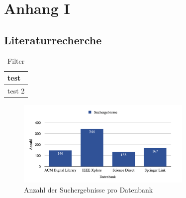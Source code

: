 \appendix

\chapter{Anhang I}
\label{ch:appendix_1}

\section{Literaturrecherche}
\label{sec:appendix_search_filter}

\begin{table}
    \centering
    \begin{tabular}{l}
        \hline
        test \\
        \toprule
        test 2 \\
        \toprule
    \end{tabular}
    \caption{Filter}
\end{table}

\begin{figure}[htb]
    \centering
    \includegraphics[width=0.75\textwidth]{contents/04_literature_review/res/database_results.png}
    \caption{Anzahl der Suchergebnisse pro Datenbank}
\end{figure}

